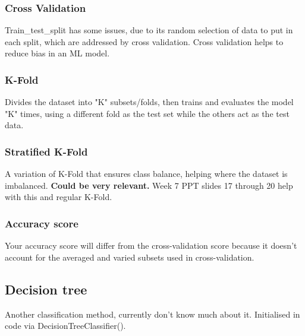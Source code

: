 \documentclass[12pt]{report}
\begin{document}
\subsubsection{Cross Validation}
Train_test_split has some issues, due to its random selection of data to put in each split, which are addressed by cross validation.
Cross validation helps to reduce bias in an ML model.
\subsubsection{K-Fold}
Divides the dataset into "K" subsets/folds, then trains and evaluates the model "K" times, using a different fold as the test set while the others 
act as the test data.
\subsubsection{Stratified K-Fold}
A variation of K-Fold that ensures class balance, helping where the dataset is imbalanced. \textbf{Could be very relevant.}
Week 7 PPT slides 17 through 20 help with this and regular K-Fold.
\subsubsection{Accuracy score}
Your accuracy score will differ from the cross-validation score because it doesn't account for the averaged and varied subsets
used in cross-validation.

\subsection{Decision tree}
Another classification method, currently don't know much about it.
Initialised in code via DecisionTreeClassifier().
\end{document}
